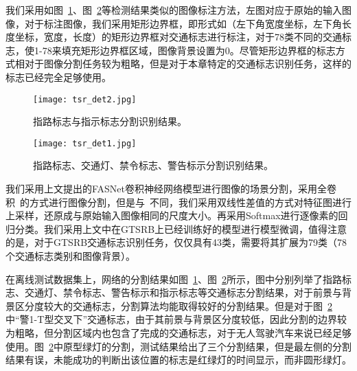 我们采用如图~\ref{fig:tsr_det2}、图~\ref{fig:tsr_det1}等检测结果类似的图像标注方法，左图对应于原始的输入图像，对于标注图像，我们采用矩形边界框，即形式如（左下角宽度坐标，左下角长度坐标，宽度，长度）的矩形边界框对交通标志进行标注，对于78类不同的交通标志，使1-78来填充矩形边界框区域，图像背景设置为0。尽管矩形边界框的标志方式相对于图像分割任务较为粗略，但是对于本章特定的交通标志识别任务，这样的标志已经完全足够使用。

\begin{figure}
\centering
\texttt{[image: tsr\_det2.jpg]}
\caption{指路标志与指示标志分割识别结果。}
\label{fig:tsr_det2}
\end{figure}

\begin{figure}
\centering
\texttt{[image: tsr\_det1.jpg]}
\caption{指路标志、交通灯、禁令标志、警告标示分割识别结果。}
\label{fig:tsr_det1}
\end{figure}



我们采用上文提出的FASNet卷积神经网络模型进行图像的场景分割，采用全卷积~\cite{long2014fully}的方式进行图像分割，但是与~\cite{long2014fully}不同，我们采用双线性差值的方式对特征图进行上采样，还原成与原始输入图像相同的尺度大小。再采用Softmax进行逐像素的回归分类。我们采用上文中在GTSRB上已经训练好的模型进行模型微调，值得注意的是，对于GTSRB交通标志识别任务，仅仅具有43类，需要将其扩展为79类（78个交通标志类别和图像背景）。

在离线测试数据集上，网络的分割结果如图~\ref{fig:tsr_det2}、图~\ref{fig:tsr_det1}所示，图中分别列举了指路标志、交通灯、禁令标志、警告标示和指示标志等交通标志分割结果，对于前景与背景区分度较大的交通标志，分割算法均能取得较好的分割结果。但是对于图~\ref{fig:tsr_det1}中“警1-T型交叉下”交通标志，由于其前景与背景区分度较低，因此分割的边界较为粗略，但分割区域内也包含了完成的交通标志，对于无人驾驶汽车来说已经足够使用。图~\ref{fig:tsr_det1}中原型绿灯的分割，测试结果给出了三个分割结果，但是最左侧的分割结果有误，未能成功的判断出该位置的标志是红绿灯的时间显示，而非圆形绿灯。

